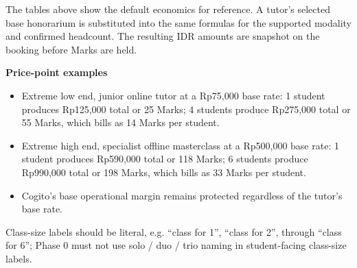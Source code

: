 \documentclass[11pt,a4paper]{article}
\begin{document}
The tables above show the default economics for reference. A tutor's selected base honorarium is substituted into the same formulas for the supported modality and confirmed headcount. The resulting IDR amounts are snapshot on the booking before Marks are held.

\textbf{Price-point examples}
\begin{itemize}
    \item Extreme low end, junior online tutor at a Rp75,000 base rate: 1 student produces Rp125,000 total or 25 Marks; 4 students produce Rp275,000 total or 55 Marks, which bills as 14 Marks per student.
    \item Extreme high end, specialist offline masterclass at a Rp500,000 base rate: 1 student produces Rp590,000 total or 118 Marks; 6 students produce Rp990,000 total or 198 Marks, which bills as 33 Marks per student.
    \item Cogito's base operational margin remains protected regardless of the tutor's base rate.
\end{itemize}

Class-size labels should be literal, e.g. ``class for 1'', ``class for 2'', through ``class for 6''; Phase 0 must not use solo / duo / trio naming in student-facing class-size labels.
\end{document}
